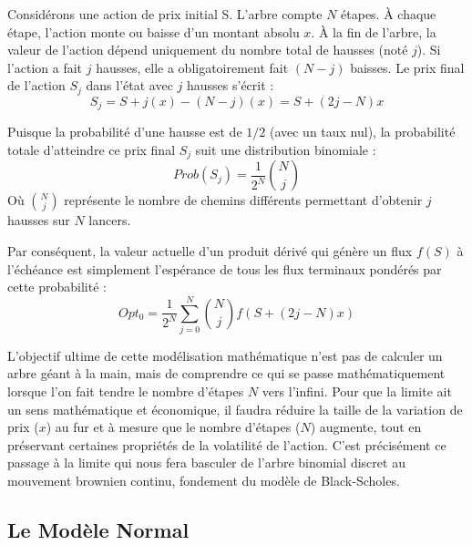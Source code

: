 \begin{theorembox}
Considérons une action de prix initial S. L'arbre compte $N$ étapes. À chaque étape, l'action monte ou baisse d'un montant absolu $x$.
À la fin de l'arbre, la valeur de l'action dépend uniquement du nombre total de hausses (noté $j$). Si l'action a fait $j$ hausses, elle a obligatoirement fait $(N - j)$ baisses.
Le prix final de l'action $S_j$ dans l'état avec $j$ hausses s'écrit :
\begin{equation*}
    S_j = S + j(x) - (N - j)(x) = S + (2j - N)x
\end{equation*}

Puisque la probabilité d'une hausse est de $1/2$ (avec un taux nul), la probabilité totale d'atteindre ce prix final $S_j$ suit une distribution binomiale :
\begin{equation*}
    Prob(S_j) = \frac{1}{2^N} \binom{N}{j}
\end{equation*}
Où $\binom{N}{j}$ représente le nombre de chemins différents permettant d'obtenir $j$ hausses sur $N$ lancers.

Par conséquent, la valeur actuelle d'un produit dérivé qui génère un flux $f(S)$ à l'échéance est simplement l'espérance de tous les flux terminaux pondérés par cette probabilité :
\begin{equation*}
    Opt_0 = \frac{1}{2^N} \sum_{j=0}^{N} \binom{N}{j} f\left(S + (2j - N)x\right)
\end{equation*}
\end{theorembox}

\newpage

\begin{intuitionbox}
L'objectif ultime de cette modélisation mathématique n'est pas de calculer un arbre géant à la main, mais de comprendre ce qui se passe mathématiquement lorsque l'on fait tendre le nombre d'étapes $N$ vers l'infini. 
Pour que la limite ait un sens mathématique et économique, il faudra réduire la taille de la variation de prix ($x$) au fur et à mesure que le nombre d'étapes ($N$) augmente, tout en préservant certaines propriétés de la volatilité de l'action. 
C'est précisément ce passage à la limite qui nous fera basculer de l'arbre binomial discret au mouvement brownien continu, fondement du modèle de Black-Scholes.
\end{intuitionbox}

\subsection{Le Modèle Normal}


